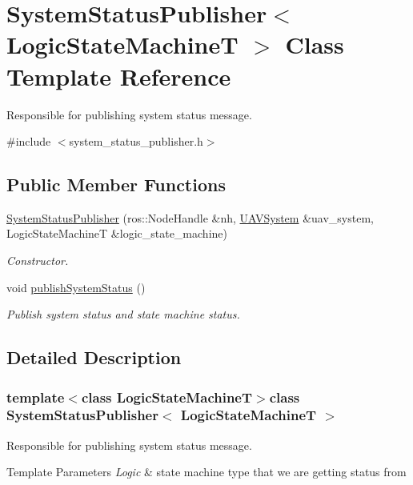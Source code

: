 \hypertarget{classSystemStatusPublisher}{\section{System\-Status\-Publisher$<$ Logic\-State\-Machine\-T $>$ Class Template Reference}
\label{classSystemStatusPublisher}
}


Responsible for publishing system status message.  




{\ttfamily \#include $<$system\-\_\-status\-\_\-publisher.\-h$>$}

\subsection*{Public Member Functions}
\begin{DoxyCompactItemize}
\item 
\hyperlink{classSystemStatusPublisher_ad02673651f93382972c5c5ea38b98e62}{System\-Status\-Publisher} (ros\-::\-Node\-Handle \&nh, \hyperlink{classUAVSystem}{U\-A\-V\-System} \&uav\-\_\-system, Logic\-State\-Machine\-T \&logic\-\_\-state\-\_\-machine)
\begin{DoxyCompactList}\small\item\em Constructor. \end{DoxyCompactList}\item 
void \hyperlink{classSystemStatusPublisher_a66f73a2e489face69d6f9fc16abb15aa}{publish\-System\-Status} ()
\begin{DoxyCompactList}\small\item\em Publish system status and state machine status. \end{DoxyCompactList}\end{DoxyCompactItemize}


\subsection{Detailed Description}
\subsubsection*{template$<$class Logic\-State\-Machine\-T$>$class System\-Status\-Publisher$<$ Logic\-State\-Machine\-T $>$}

Responsible for publishing system status message. 


\begin{DoxyTemplParams}{Template Parameters}
{\em Logic} & state machine type that we are getting status from \\
\hline
\end{DoxyTemplParams}


